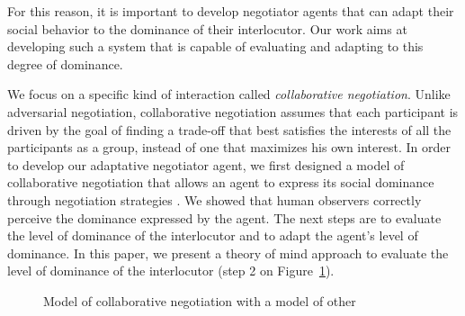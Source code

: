 \documentclass[sigconf]{aamas}  %
\begin{document}
	For this reason, it is important to develop negotiator agents that can adapt their social behavior to the dominance of their interlocutor. Our work aims at developing such a system that is capable of evaluating and adapting to this degree of dominance.
	
	We focus on a specific kind of interaction called \emph{collaborative negotiation}. Unlike adversarial negotiation, collaborative negotiation assumes that each participant is driven by the goal of finding a trade-off that best satisfies the interests of all the participants as a group, instead of one that maximizes his own interest\cite{sidner1994artificial,chu1995response}. In order to develop our adaptative negotiator agent, we first designed a model of collaborative negotiation that allows an agent to express its social dominance through negotiation strategies \cite{ouali2017computational}. We showed that human observers correctly perceive the dominance expressed by the agent. The next steps are to evaluate the level of dominance of the interlocutor and to adapt the agent's level of dominance. In this paper, we present a theory of mind approach to evaluate the level of dominance of the interlocutor (step 2 on Figure~\ref{fig:schema-general}).

	\begin{figure}
			\caption{Model of collaborative negotiation with a model of other} 
			\label{fig:schema-general}
	\end{figure} 
	
\end{document}
